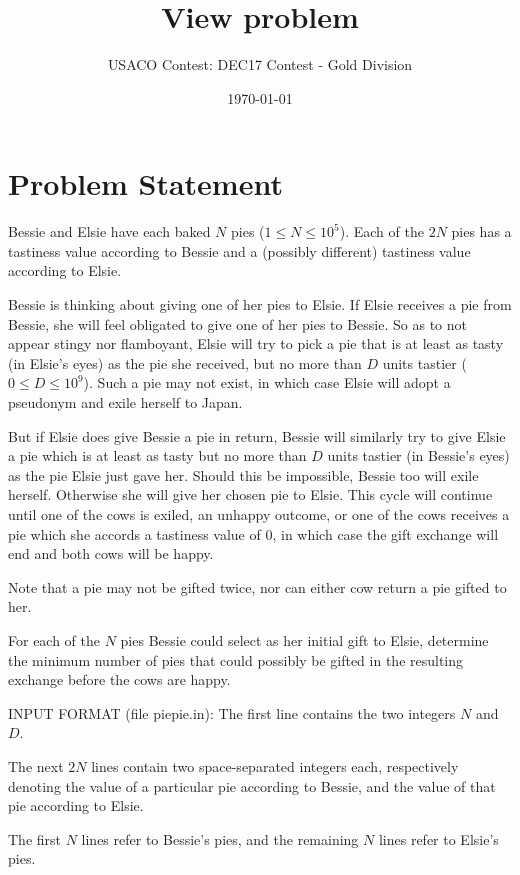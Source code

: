 \documentclass[12pt]{article}
\title{View problem}
\author{USACO Contest: DEC17 Contest - Gold Division}
\date{\today}
\begin{document}
\maketitle

\section*{Problem Statement}

Bessie and Elsie have each baked $N$ pies ($1 \leq N \leq 10^5$). Each of the
$2N$ pies has a tastiness value according to Bessie and a (possibly different)
tastiness value according to Elsie.

Bessie is thinking about giving one of her pies to Elsie. If Elsie receives a
pie from Bessie, she will feel obligated to give one of her pies to Bessie. So
as to not appear stingy nor flamboyant, Elsie will try to pick a pie that is at
least as tasty (in Elsie's eyes) as the pie she received, but no more than $D$
units tastier ($0 \leq D \leq 10^9$). Such a pie may not exist, in which case
Elsie will adopt a pseudonym and exile herself to Japan.

But if Elsie does give Bessie a pie in return, Bessie will similarly try to give
Elsie a pie which is at least as tasty but no more than $D$ units tastier (in
Bessie's eyes) as the pie Elsie just gave her. Should this be impossible, Bessie
too will exile herself. Otherwise she will give her chosen pie to Elsie. This
cycle will continue until one of the cows is exiled, an unhappy outcome, or one
of the cows receives a pie which she accords a tastiness value of $0$, in which
case the gift exchange will end and both cows will be happy.

Note that a pie may not be gifted twice, nor can either cow return a pie gifted
to her.

For each of the $N$ pies Bessie could select as her initial gift to Elsie, determine the
minimum number of pies that could possibly be gifted in the resulting exchange
before the cows are happy.  

INPUT FORMAT (file piepie.in):
The first line contains the two integers $N$ and $D$.

The next $2N$ lines contain two space-separated integers each, respectively
denoting the value of a particular pie according to Bessie, and the value of
that pie according to Elsie.

The first $N$ lines refer to Bessie's pies, and the remaining $N$ lines refer to
Elsie's pies.
\end{document}
